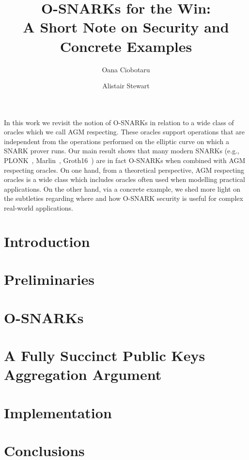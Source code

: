 \documentclass[10pt]{article}
\title{O-SNARKs for the Win: \\
 A Short Note on Security and Concrete Examples}
\author[1]{Oana Ciobotaru}
\author[1]{Alistair Stewart}
\affil[1]{Web3 Foundation}
\begin{document}
   \maketitle

\abstract In this work we revisit the notion of O-SNARKs in relation to a wide class of 
oracles which we call AGM respecting. These oracles support operations that are independent from the operations 
performed on the elliptic curve on which a SNARK prover runs. Our main result shows that many modern SNARKs 
(e.g., PLONK~\cite{plonk}, Marlin~\cite{marlin}, Groth16~\cite{groth16}) are in fact O-SNARKs when combined 
with AGM respecting oracles. On one hand, from a theoretical perspective, AGM respecting oracles is a wide class 
which includes oracles often used when modelling practical applications. On the other hand, via a concrete example, 
we shed more light on the subtleties regarding where and how O-SNARK security is useful for complex real-world applications.
    
\section{Introduction} \label{sec_intro}


\section{Preliminaries} \label{sec_prelims}

%
%
%


\section{O-SNARKs} \label{sec:short_snarks_defs}

%
%
%

\section{A Fully Succinct Public Keys Aggregation Argument} \label{sec_apk_proofs}


\section{Implementation} \label{sec_implementation}


\section{Conclusions} \label{conclusions}


 

\appendix

%

\end{document}
